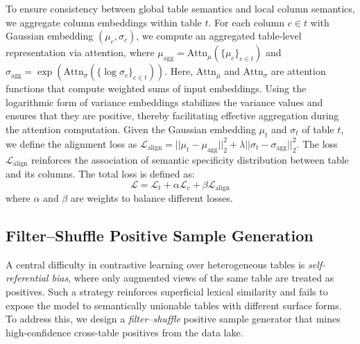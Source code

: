 To ensure consistency between global table semantics and local column semantics, we aggregate column embeddings within table \(t\). 
For each column \(c \in t\) with Gaussian embedding \((\mu_c, \sigma_c)\), we compute an aggregated table-level representation via attention, where \(\mu_{\text{agg}} = \text{Attn}_{\mu}(\{\mu_{c}\}_{c\in t})\) and \(\sigma_{\text{agg}} = \exp(\text{Attn}_{\sigma}(\{\log\sigma_{c}\}_{c\in t}))\). Here, $\text{Attn}_{\mu}$ and $\text{Attn}_{\sigma}$ are attention functions that compute weighted sums of input embeddings. Using the logarithmic form of variance embeddings stabilizes the variance values and ensures that they are positive, thereby facilitating effective aggregation during the attention computation. Given the Gaussian embedding $\mu_t$ and $\sigma_t$ of table $t$, we define the alignment loss as $\mathcal{L}_{\text{align}}=||\mu_t-\mu_\text{agg}||_2^2+\lambda||\sigma_t-\sigma_\text{agg}||_2^2$. The loss $\mathcal{L}_\text{align}$ reinforces the association of semantic specificity distribution between table and its columns. The total loss is defined as:
\begin{equation}
\label{eq_loss}
\mathcal{L}=\mathcal{L}_t+\alpha\mathcal{L}_c+\beta\mathcal{L}_\text{align}
\end{equation}
where $\alpha$ and $\beta$ are weights to balance different losses.

\subsection{Filter–Shuffle Positive Sample Generation}
\label{sub_sg}
A central difficulty in contrastive learning over heterogeneous tables is \emph{self-referential bias}, where only augmented views of the same table are treated as positives. 
Such a strategy reinforces superficial lexical similarity and fails to expose the model to semantically unionable tables with different surface forms. 
To address this, we design a \emph{filter–shuffle} positive sample generator that mines high-confidence cross-table positives from the data lake.



